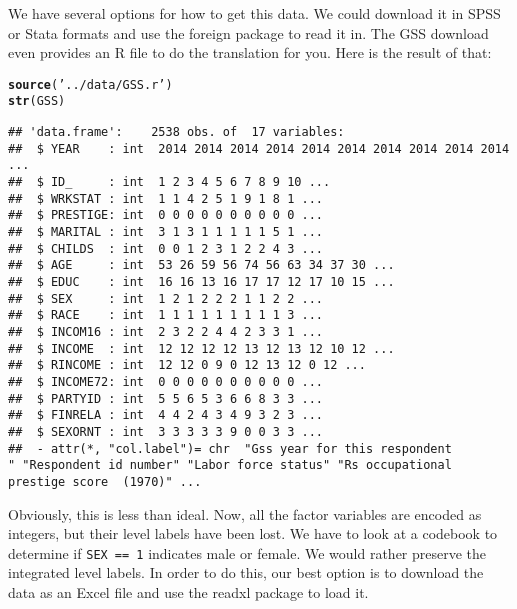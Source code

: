 \documentclass[fleqn,10pt,lineno]{wlpeerj}\usepackage[]{graphicx}\usepackage[]{color}
\makeatletter
\newcommand{\hlstr}[1]{\textcolor[rgb]{0.192,0.494,0.8}{#1}}%
\newcommand{\hlstd}[1]{\textcolor[rgb]{0.345,0.345,0.345}{#1}}%
\newcommand{\hlkwd}[1]{\textcolor[rgb]{0.737,0.353,0.396}{\textbf{#1}}}%
\newenvironment{kframe}{%
 \def\at@end@of@kframe{}%
 \ifinner\ifhmode%
  \def\at@end@of@kframe{\end{minipage}}%
  \begin{minipage}{\columnwidth}%
 \fi\fi%
 \def\FrameCommand##1{\hskip\@totalleftmargin \hskip-\fboxsep
 \colorbox{shadecolor}{##1}\hskip-\fboxsep
     \hskip-\linewidth \hskip-\@totalleftmargin \hskip\columnwidth}%
 \MakeFramed {\advance\hsize-\width
   \@totalleftmargin\z@ \linewidth\hsize
   \@setminipage}}%
 {\par\unskip\endMakeFramed%
 \at@end@of@kframe}
\newenvironment{knitrout}{}{} %
\newcommand{\pkg}[1]{{\fontseries{b}\selectfont #1}}
\makeatother
\begin{document}
We have several options for how to get this data. We could download it in SPSS or Stata formats and use the foreign package to read it in. The GSS download even provides an R file to do the translation for you. Here is the result of that:

\begin{knitrout}\footnotesize
{}\color{fgcolor}\begin{kframe}
\begin{alltt}
\hlkwd{source}\hlstd{(}\hlstr{'../data/GSS.r'}\hlstd{)}
\hlkwd{str}\hlstd{(GSS)}
\end{alltt}
\begin{verbatim}
## 'data.frame':	2538 obs. of  17 variables:
##  $ YEAR    : int  2014 2014 2014 2014 2014 2014 2014 2014 2014 2014 ...
##  $ ID_     : int  1 2 3 4 5 6 7 8 9 10 ...
##  $ WRKSTAT : int  1 1 4 2 5 1 9 1 8 1 ...
##  $ PRESTIGE: int  0 0 0 0 0 0 0 0 0 0 ...
##  $ MARITAL : int  3 1 3 1 1 1 1 1 5 1 ...
##  $ CHILDS  : int  0 0 1 2 3 1 2 2 4 3 ...
##  $ AGE     : int  53 26 59 56 74 56 63 34 37 30 ...
##  $ EDUC    : int  16 16 13 16 17 17 12 17 10 15 ...
##  $ SEX     : int  1 2 1 2 2 2 1 1 2 2 ...
##  $ RACE    : int  1 1 1 1 1 1 1 1 1 3 ...
##  $ INCOM16 : int  2 3 2 2 4 4 2 3 3 1 ...
##  $ INCOME  : int  12 12 12 12 13 12 13 12 10 12 ...
##  $ RINCOME : int  12 12 0 9 0 12 13 12 0 12 ...
##  $ INCOME72: int  0 0 0 0 0 0 0 0 0 0 ...
##  $ PARTYID : int  5 5 6 5 3 6 6 8 3 3 ...
##  $ FINRELA : int  4 4 2 4 3 4 9 3 2 3 ...
##  $ SEXORNT : int  3 3 3 3 3 9 0 0 3 3 ...
##  - attr(*, "col.label")= chr  "Gss year for this respondent                       " "Respondent id number" "Labor force status" "Rs occupational prestige score  (1970)" ...
\end{verbatim}
\end{kframe}
\end{knitrout}

Obviously, this is less than ideal. Now, all the factor variables are encoded as integers, but their level labels have been lost. We have to look at a codebook to determine if \verb#SEX == 1# indicates male or female. We would rather preserve the integrated level labels. In order to do this, our best option is to download the data as an Excel file and use the \pkg{readxl} package to load it. 
\end{document}
